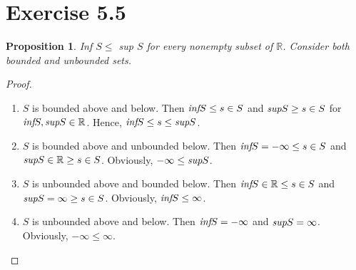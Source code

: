 \documentclass{article}
\newtheorem{proposition}[thm]{Proposition}
\begin{document}
\section*{Exercise 5.5}
\begin{proposition}
    Inf $S \le$ sup $S$ for every nonempty subset of $\mathbb{R}$. Consider both bounded and 
    unbounded sets.
\end{proposition}
\begin{proof} 
    \indent
    \begin{enumerate}[label = Case \arabic*:]
        \item $S$ is bounded above and below. Then $\emph{inf}S \le s \in S$ 
        and $\emph{sup}S \ge s \in S$ for $\emph{inf}S, \emph{sup}S \in \mathbb{R}$. 
        Hence, $\emph{inf}S \le s\le \emph{sup}S$.

        \item $S$ is bounded above and unbounded below. Then $\emph{inf}S = -\infty\le s \in S$ and 
        $\emph{sup}S \in\mathbb{R} \ge s\in S$. Obviously, $-\infty \le \emph{sup}S$.

        \item $S$ is unbounded above and bounded below. Then $\emph{inf}S \in\mathbb{R}\le s \in S$ 
        and $\emph{sup}S = \infty \ge s\in S$. Obviously, $\emph{inf}S \le \infty$.

        \item $S$ is unbounded above and below. Then $\emph{inf}S = -\infty$ and $\emph{sup}S = 
        \infty$. Obviously, $-\infty \le \infty$.
    \end{enumerate}
\end{proof}
\end{document}
